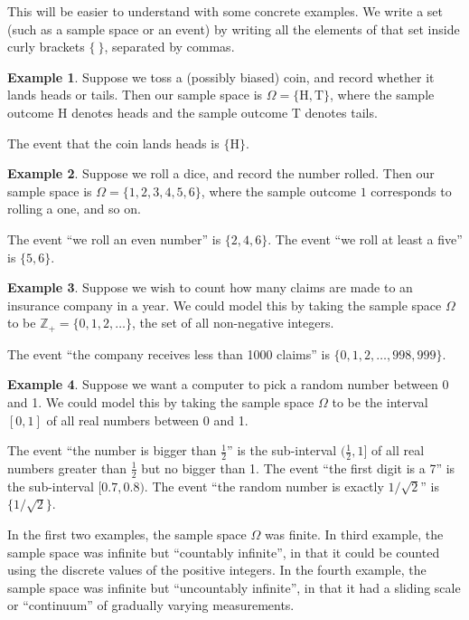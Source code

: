 \documentclass[
  a4paper,
]{book}
\theoremstyle{definition}
\theoremstyle{definition}
\newtheorem{example}{Example}[chapter]
\theoremstyle{definition}
\theoremstyle{definition}
\theoremstyle{remark}
\begin{document}
This will be easier to understand with some concrete examples. We write a set (such as a sample space or an event) by writing all the elements of that set inside curly brackets \(\{\ \}\), separated by commas.

\begin{example}
Suppose we toss a (possibly biased) coin, and record whether it lands heads or tails. Then our sample space is \(\Omega = \{\mathrm H, \mathrm T\}\), where the sample outcome H denotes heads and the sample outcome T denotes tails.

The event that the coin lands heads is \(\{\mathrm H\}\).
\end{example}

\begin{example}
Suppose we roll a dice, and record the number rolled. Then our sample space is \(\Omega = \{1,2,3,4,5,6\}\), where the sample outcome \(1\) corresponds to rolling a one, and so on.

The event ``we roll an even number'' is \(\{2,4,6\}\). The event ``we roll at least a five'' is \(\{5,6\}\).
\end{example}

\begin{example}
Suppose we wish to count how many claims are made to an insurance company in a year. We could model this by taking the sample space \(\Omega\) to be \(\mathbb Z_+ = \{0, 1, 2, \dots\}\), the set of all non-negative integers.

The event ``the company receives less than 1000 claims'' is \(\{0, 1, 2, \dots, 998, 999\}\).
\end{example}

\begin{example}
Suppose we want a computer to pick a random number between 0 and 1. We could model this by taking the sample space \(\Omega\) to be the interval \([0, 1]\) of all real numbers between 0 and 1.

The event ``the number is bigger than \(\frac12\)'' is the sub-interval \((\frac12, 1]\) of all real numbers greater than \(\frac12\) but no bigger than 1. The event ``the first digit is a 7'' is the sub-interval \([0.7, 0.8)\). The event ``the random number is exactly \(1/\sqrt{2}\)'' is \(\{1/\sqrt{2}\}\).
\end{example}

In the first two examples, the sample space \(\Omega\) was finite. In third example, the sample space was infinite but ``countably infinite'', in that it could be counted using the discrete values of the positive integers. In the fourth example, the sample space was infinite but ``uncountably infinite'', in that it had a sliding scale or ``continuum'' of gradually varying measurements.
\end{document}
